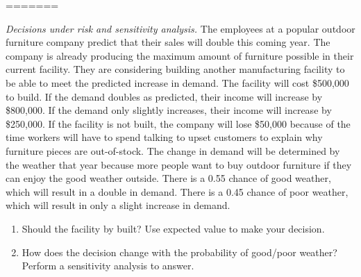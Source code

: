 =======
\item \emph {Decisions under risk and sensitivity analysis.} The employees at a popular outdoor furniture company predict that their sales will double this  coming year. The company is already producing the maximum amount of furniture possible in their current facility. They are considering building another manufacturing facility to be able to meet the predicted increase in demand. The facility will cost \$500,000 to build. If the demand doubles as predicted, their income will increase by \$800,000. If the demand only slightly increases, their income will increase by \$250,000. If the facility is not built, the company will lose \$50,000 because of the time workers will have to spend talking to upset customers to explain why furniture pieces are out-of-stock. The change in demand will be determined by the weather that year because more people want to buy outdoor furniture if they can enjoy the good weather outside. There is a 0.55 chance of good weather, which will result in a double in demand. There is a 0.45 chance of poor weather, which will result in only a slight increase in demand.

\begin{enumerate}
	\item Should the facility by built? Use expected value to make your decision.
	
	\item How does the decision change with the probability of good/poor
	weather? Perform a sensitivity analysis to answer.
	
\end{enumerate}

